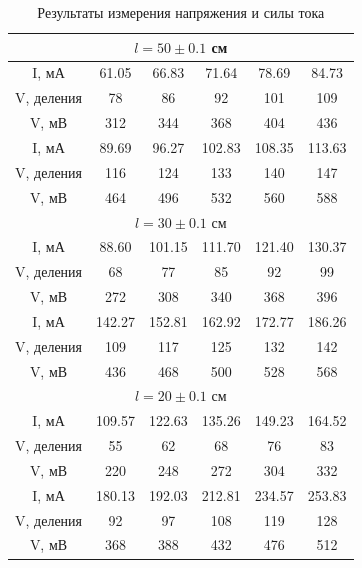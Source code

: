 \documentclass[a4paper,12pt]{article}
\begin{document}
\begin{table}[H]
\centering
\caption{Результаты измерения напряжения и силы тока}
\begin{tabular}{|c|c|c|c|c|c|}
\hline
   \multicolumn{6}{|c|}{$l = 50 \pm 0.1$ см}\\
\hline
I, мА & 61.05 & 66.83 & 71.64 & 78.69 & 84.73\\
\hline
V, деления & 78 & 86 & 92 & 101 & 109\\
\hline
V, мВ & 312 & 344 & 368 & 404 & 436\\
\hline

I, мА & 89.69 & 96.27 & 102.83 & 108.35 & 113.63\\
\hline
V, деления & 116 & 124 & 133 & 140 & 147\\
\hline
V, мВ & 464 & 496 & 532 & 560 & 588\\
\hline
\hline

   \multicolumn{6}{|c|}{$l = 30 \pm 0.1$ см} \\
\hline
I, мА & 88.60 & 101.15 & 111.70 & 121.40 & 130.37 \\
\hline
V, деления & 68 & 77 & 85 & 92 & 99 \\
\hline
V, мВ & 272 & 308 & 340 & 368 & 396 \\
\hline

I, мА & 142.27 & 152.81 & 162.92 & 172.77 & 186.26  \\
\hline
V, деления & 109 & 117 & 125 & 132 & 142 \\
\hline
V, мВ & 436 & 468 & 500 & 528 & 568 \\
\hline
\hline

   \multicolumn{6}{|c|}{$l = 20 \pm 0.1$ см} \\
I, мА & 109.57 & 122.63 & 135.26 & 149.23 & 164.52  \\
\hline
V, деления & 55 & 62 & 68 & 76 & 83 \\
\hline
V, мВ & 220 & 248 & 272 & 304 & 332 \\
\hline

I, мА & 180.13 & 192.03 & 212.81 & 234.57 & 253.83 \\
\hline
V, деления & 92 & 97 & 108 & 119 & 128 \\
\hline
V, мВ & 368 & 388 & 432 & 476 & 512  \\
\hline

\end{tabular}
\label{ампвол}
\end{table}
\end{document}
